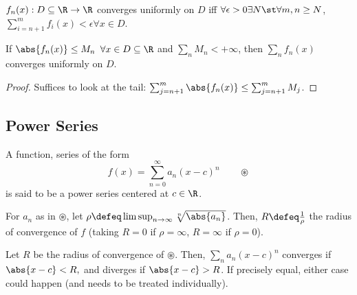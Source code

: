 \begin{theorem}
    $f_n(x) : D \subseteq \R \to \R$ converges uniformly on $D$ iff $\forall \epsilon >0 \exists N \st \forall m,n \geq N$, $\sum_{i=n+1}^m f_i(x) < \epsilon \forall x\in D$.
\end{theorem}

\begin{proposition}
    If $\abs{f_n(x)} \leq M_n$ $\forall x \in D \subseteq \R$ and $\sum_{n} M_n < + \infty$, then $\sum_{n} f_n(x)$ converges uniformly on $D$.
\end{proposition}

\begin{proof}
    Suffices to look at the tail: $\sum_{j=n+1}^m \abs{f_n(x)} \leq \sum_{j=n+1}^m M_j$.
\end{proof}

\subsection{Power Series}

\begin{definition}
    A function, series of the form \[
    f(x) = \sum_{n=0}^\infty a_n (x - c)^n    \qquad \circledast
    \]
    is said to be a power series centered at $c \in \R$.
\end{definition}

\begin{definition}
    For $a_n$ as in $\circledast$, let $\rho \defeq \limsup_{n \to \infty} \sqrt[n]{\abs{a_n}}$. Then, $R \defeq \frac{1}{\rho}$ the radius of convergence of $f$ (taking $R = 0$ if $\rho = \infty$, $R = \infty$ if $\rho = 0$).
\end{definition}

\begin{theorem}
    Let $R$ be the radius of convergence of $\circledast$. Then, $
    \sum_n a_n (x - c)^n $ converges if $\abs{x - c} < R,$    and diverges if $\abs{x - c} > R$. If precisely equal, either case could happen (and needs to be treated individually).
\end{theorem}


